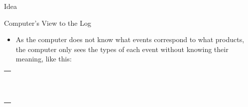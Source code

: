 \documentclass[final,xcolor={usenames,x11names}]{beamer}
\newlength{\onecolwid}
\begin{document}
\begin{frame}[t]
\begin{columns}[t]
\begin{column}{\onecolwid}
\begin{block}{Idea}
\end{block}

\vspace{3cm}

\begin{alertblock}{Computer's View to the Log}

\begin{itemize}
\item As the computer does not know what events correspond to what products, the computer only sees the types of each event without knowing their meaning, like this:
\end{itemize}

\begin{center}
{
\ttfamily
\begin{tabular}{|c|}
  \hline
  \cellcolor{PaleTurquoise2}\hspace{3cm}
  \\
  \hline
  \cellcolor{PaleTurquoise2>wheel,1,11}\hspace{3cm}
  \\
  \hline
  \cellcolor{PaleTurquoise2>wheel,2,11}\hspace{3cm}
  \\
  \hline
  \cellcolor{PaleTurquoise2>wheel,3,11}\hspace{3cm}
  \\
  \hline
  \cellcolor{PaleTurquoise2>wheel,4,11}\hspace{3cm}
  \\
  \hline
  \cellcolor{PaleTurquoise2>wheel,2,11}\hspace{3cm}
  \\
  \hline
  \cellcolor{PaleTurquoise2>wheel,5,11}\hspace{3cm}
  \\
  \hline
  \cellcolor{PaleTurquoise2}\hspace{3cm}
  \\
  \hline
  \cellcolor{PaleTurquoise2>wheel,2,11}\hspace{3cm}
  \\
  \hline
  \cellcolor{PaleTurquoise2>wheel,1,11}\hspace{3cm}
  \\
  \hline
  \cellcolor{PaleTurquoise2>wheel,3,11}\hspace{3cm}
  \\
  \hline
  \cellcolor{PaleTurquoise2>wheel,2,11}\hspace{3cm}
  \\
  \hline
  \cellcolor{PaleTurquoise2>wheel,4,11}\hspace{3cm}

\end{tabular}}
\end{center}
\end{alertblock}
\end{column}
\end{columns}
\end{frame}
\end{document}
